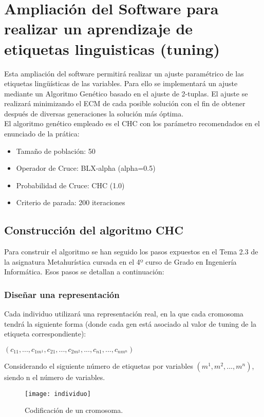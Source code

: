 \documentclass[12pt,a4paper]{article}
\begin{document}
\section{Ampliación del Software para realizar un aprendizaje de etiquetas linguisticas (tuning)}
Esta ampliación del software permitirá realizar un ajuste paramétrico de las etiquetas lingüísticas de las variables. Para ello se implementará un ajuste mediante un Algoritmo Genético basado en el ajuste de 2-tuplas.
El ajuste se realizará minimizando el ECM de cada posible solución con el fin de obtener después de diversas generaciones la solución más óptima.\\
El algoritmo genético empleado es el CHC con los parámetro recomendados en el enunciado de la prática:
\begin{itemize}
\item Tamaño de población: 50
\item Operador de Cruce: BLX-alpha (alpha=0.5)
\item Probabilidad de Cruce: CHC (1.0)
\item Criterio de parada: 200 iteraciones
\end{itemize}

\subsection{Construcción del algoritmo CHC}
Para construir el algoritmo se han seguido los pasos expuestos en el Tema 2.3 de la asignatura Metahurística cursada en el 4º curso de Grado en Ingeniería Informática. Esos pasos se detallan a continuación:

\subsubsection{Diseñar una representación}
Cada individuo utilizará una representación real, en la que cada cromosoma tendrá la siguiente forma (donde cada gen está asociado al valor de tuning de la etiqueta correspondiente):
\begin{center}
$(c_{11},...,c_{1m^{1}},c_{21},...,c_{2m^{2}},...,c_{n1},...,c_{nm^{n}})$
\end{center}
Considerando el siguiente número de etiquetas por variables $(m^{1},m^{2},...,m^{n})$, siendo n el número de variables.
\begin{figure}[H]
\centering
\texttt{[image: individuo]}
\caption{Codificación de un cromosoma.}
\label{individuo}
\end{figure}
\end{document}
